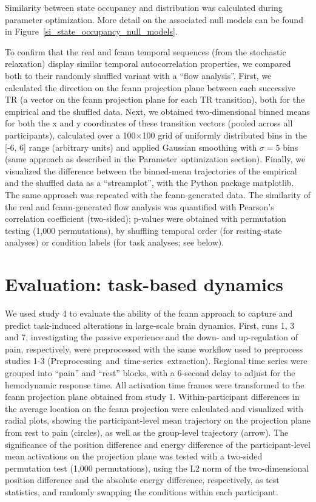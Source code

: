 \documentclass{article}
\begin{document}
Similarity between state occupancy and distribution was calculated during parameter optimization. More detail on the associated null models can be found in Figure~\ref{si_state_occupancy_null_models}.

To confirm that the real and \acrshort{fcann} temporal sequences (from the stochastic relaxation) display similar temporal autocorrelation properties, we compared both to their randomly shuffled variant with a ``flow analysis''.
First, we calculated the direction on the \acrshort{fcann} projection plane between each successive TR (a vector on the \acrshort{fcann} projection plane for each TR transition), both for the empirical and the shuffled data.
Next, we obtained two‑dimensional binned means for both the x and y coordinates of these transition vectors (pooled across all participants), calculated over a 100$\times$100 grid of uniformly distributed bins in the [-6, 6] range (arbitrary units) and applied Gaussian smoothing with $\sigma=5$ bins (same approach as described in the Parameter~optimization section).
Finally, we visualized the difference between the binned-mean trajectories of the empirical and the shuffled data as a ``streamplot'', with the Python package matplotlib.
The same approach was repeated with the \acrshort{fcann}-generated data. The similarity of the real and \acrshort{fcann}-generated flow analysis was quantified with Pearson's correlation coefficient (two-sided); p-values were obtained with permutation testing (1,000 permutations), by shuffling temporal order (for resting-state analyses) or condition labels (for task analyses; see below).

\section{Evaluation: task-based dynamics}

We used study 4 to evaluate the ability of the \acrshort{fcann} approach to capture and predict task-induced alterations in large-scale brain dynamics.
First, runs 1, 3 and 7, investigating the passive experience and the down- and up-regulation of pain, respectively, were preprocessed with the same workflow used to preprocess studies 1-3 (Preprocessing~and~time-series~extraction). Regional time series were grouped into ``pain'' and ``rest'' blocks, with a 6-second delay to adjust for the hemodynamic response time. All activation time frames were transformed to the \acrshort{fcann} projection plane obtained from study 1. Within-participant differences in the average location on the \acrshort{fcann} projection were calculated and visualized with radial plots, showing the participant-level mean trajectory on the projection plane from rest to pain (circles), as well as the group-level trajectory (arrow). The significance of the position difference and energy difference of the participant-level mean activations on the projection plane was tested with a two-sided permutation test (1,000 permutations), using the L2 norm of the two-dimensional position difference and the absolute energy difference, respectively, as test statistics, and randomly swapping the conditions within each participant.
\end{document}
